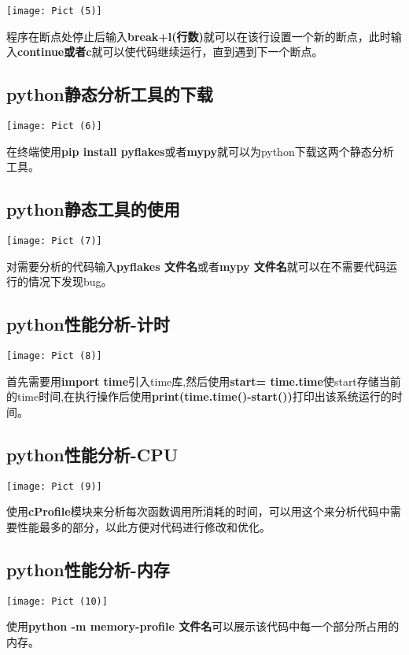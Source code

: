 \documentclass[a4paper, 12pt]{article}
\begin{document}
\texttt{[image: Pict (5)]}

程序在断点处停止后输入\textbf{break+l(行数)}就可以在该行设置一个新的断点，此时输入\textbf{continue或者c}就可以使代码继续运行，直到遇到下一个断点。

\subsection{\small python静态分析工具的下载}
\texttt{[image: Pict (6)]}

在终端使用\textbf{pip install pyflakes}或者\textbf{mypy}就可以为python下载这两个静态分析工具。

\subsection{\small python静态工具的使用}

\texttt{[image: Pict (7)]}

对需要分析的代码输入\textbf{pyflakes 文件名}或者\textbf{mypy 文件名}就可以在不需要代码运行的情况下发现bug。

\subsection{\small python性能分析-计时}

\texttt{[image: Pict (8)]}

首先需要用\textbf{import time}引入time库,然后使用\textbf{start= time.time}使start存储当前的time时间,在执行操作后使用\textbf{print(time.time()-start())}打印出该系统运行的时间。

\subsection{\small python性能分析-CPU}
\texttt{[image: Pict (9)]}

使用\textbf{cProfile}模块来分析每次函数调用所消耗的时间，可以用这个来分析代码中需要性能最多的部分，以此方便对代码进行修改和优化。

\subsection{\small python性能分析-内存}
\texttt{[image: Pict (10)]}

使用\textbf{python -m memory-profile 文件名}可以展示该代码中每一个部分所占用的内存。
\end{document}
